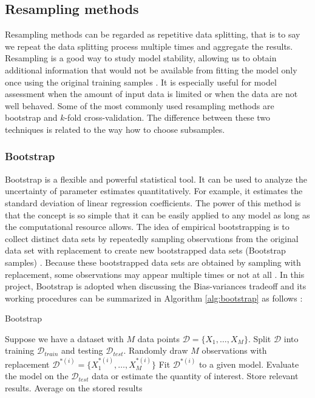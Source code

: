 \documentclass[a4paper]{article}
\begin{document}
\subsection{Resampling methods}
Resampling methods can be regarded as repetitive data splitting, that is to say we repeat the data splitting process multiple times and aggregate the results. Resampling is a good way to study model stability, allowing us to obtain additional information that would not be available from fitting the model only once using the original training samples \cite{lec}. It is especially useful for model assessment when the amount of input data is limited or when the data are not well behaved. Some of the most commonly used resampling methods are bootstrap and $k$-fold cross-validation. The difference between these two techniques is related to the way how to choose subsamples. 

\subsubsection*{Bootstrap}
Bootstrap is a flexible and powerful statistical tool. It can be used to analyze the uncertainty of parameter estimates quantitatively\cite{1986}. For example, it estimates the standard deviation of linear regression coefficients. The power of this method is that the concept is so simple that it can be easily applied to any model as long as the computational resource allows. The idea of empirical bootstrapping is to collect distinct data sets by repeatedly sampling observations from the original data set with replacement to create new bootstrapped data sets (Bootstrap samples) \cite{Pankaj}. Because these bootstrapped data sets are obtained by sampling with replacement, some observations may appear multiple times or not at all \cite{Kuhn}. In this project, Bootstrap is adopted when discussing the Bias-variances tradeoff and its working procedures can be summarized in Algorithm \ref{alg:bootstrap} as follows \cite{lec}:
\begin{algorithm}[H]
    \caption{Bootstrap}
    \label{alg:bootstrap}
    \begin{algorithmic}[1]
        \State Suppose we have a dataset with $M$ data points
        $\mathcal{D} = \{X_1,\ldots,X_M\}$.
        \State Split $\mathcal{D}$ into training $\mathcal{D}_{train}$ and testing $\mathcal{D}_{test}$.
            \State Randomly draw $M$ observations with replacement 
            $\mathcal{D}^{*(i)} = \{X_1^{*(i)},\ldots,X_M^{*(i)}\}$
            \State Fit $\mathcal{D}^{*(i)}$ to a given model.
            \State Evaluate the model on the $\mathcal{D}_{test}$ data or estimate the quantity of interest.
            \State Store relevant results.
        \EndFor
        \State Average on the stored results
    \end{algorithmic}
\end{algorithm}
\end{document}
